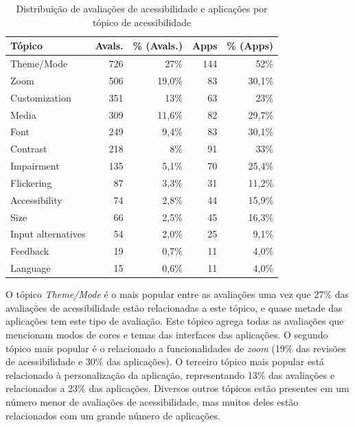 \begin{table}[]
\centering
\caption{Distribuição de avaliações de acessibilidade e aplicações por tópico de acessibilidade}
\label{tab:group-keywords}
\begin{tabular}{lrrrr}
\hline
Tópico        & Avals.  & \% (Avals.) & Apps & \% (Apps) \\
\hline
Theme/Mode    & 726     & 27\%        & 144  & 52\%  \\
Zoom          & 506     & 19,0\%      & 83   & 30,1\%  \\
Customization & 351     & 13\%        & 63   & 23\%  \\
Media         & 309     & 11,6\%      & 82   & 29,7\%  \\
Font          & 249     & 9,4\%       & 83   & 30,1\%  \\
Contrast      & 218     & 8\%         & 91  & 33\%  \\
Impairment    & 135     & 5,1\%       & 70   & 25,4\%  \\
Flickering    & 87      & 3,3\%       & 31   & 11,2\%  \\
Accessibility & 74      & 2,8\%       & 44   & 15,9\%  \\
Size          & 66      & 2,5\%       & 45   & 16,3\%  \\
Input alternatives        & 54       & 2,0\%      & 25   & 9,1\%   \\
Feedback      & 19      & 0,7\%      & 11   & 4,0\%   \\
Language      & 15      & 0,6\%      & 11   & 4,0\%  \\
\hline
\end{tabular}
\end{table}

O tópico \textit{Theme/Mode} é o mais popular entre as avaliações uma vez que 27\% das avaliações de acessibilidade estão relacionadas a este tópico, e quase metade das aplicações tem este tipo de avaliação. 
Este tópico agrega todas as avaliações que mencionam modos de cores e temas das interfaces das aplicações. 
O segundo tópico mais popular é o relacionado a funcionalidades de \textit{zoom} (19\% das revisões de acessibilidade e 30\% das aplicações).
O terceiro tópico mais popular está relacionado à personalização da aplicação, representando 13\% das avaliações e relacionados a 23\% das aplicações. 
Diversos outros tópicos estão presentes em um número menor de avaliações de acessibilidade, mas muitos deles estão relacionados com um grande número de aplicações. 

